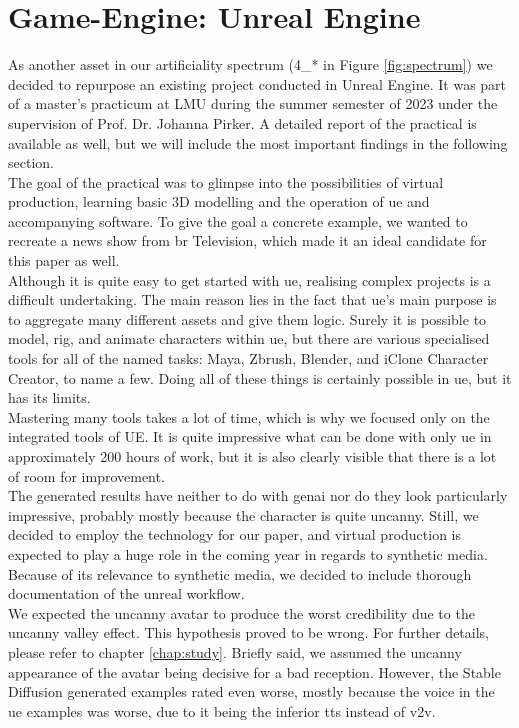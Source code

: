 \documentclass[
  a4paper,  %
  twoside,  %
  bibliography=totoc,
  headsepline,
  cleardoublepage=empty,
  parskip=half,
  draft=false
]{scrbook}
\begin{document}
\section{Game-Engine: Unreal Engine}
As another asset in our artificiality spectrum (4\_* in Figure \ref{fig:spectrum}) we decided to repurpose an existing project conducted in Unreal Engine. It was part of a master's practicum at LMU during the summer semester of 2023 under the supervision of Prof. Dr. Johanna Pirker. A detailed report of the practical is available as well, but we will include the most important findings in the following section. \\
The goal of the practical was to glimpse into the possibilities of virtual production, learning basic 3D modelling and the operation of \gls{ue} and accompanying software. To give the goal a concrete example, we wanted to recreate a news show from \gls{br} Television, which made it an ideal candidate for this paper as well. \\
Although it is quite easy to get started with \gls{ue}, realising complex projects is a difficult undertaking. The main reason lies in the fact that \gls{ue}'s main purpose is to aggregate many different assets and give them logic. Surely it is possible to model, rig, and animate characters within \gls{ue}, but there are various specialised tools for all of the named tasks: Maya, Zbrush, Blender, and iClone Character Creator, to name a few. Doing all of these things is certainly possible in \gls{ue}, but it has its limits. \\
Mastering many tools takes a lot of time, which is why we focused only on the integrated tools of UE. It is quite impressive what can be done with only \gls{ue} in approximately 200 hours of work, but it is also clearly visible that there is a lot of room for improvement. \\
The generated results have neither to do with \gls{genai} nor do they look particularly impressive, probably mostly because the character is quite uncanny. Still, we decided to employ the technology for our paper, and virtual production is expected to play a huge role in the coming year in regards to synthetic media. Because of its relevance to synthetic media, we decided to include thorough documentation of the unreal workflow. \\
We expected the uncanny avatar to produce the worst credibility due to the uncanny valley effect. This hypothesis proved to be wrong. For further details, please refer to chapter \ref{chap:study}. Briefly said, we assumed the uncanny appearance of the avatar being decisive for a bad reception. However, the Stable Diffusion generated examples rated even worse, mostly because the voice in the \gls{ue} examples was worse, due to it being the inferior \gls{tts} instead of \gls{v2v}.
\end{document}
